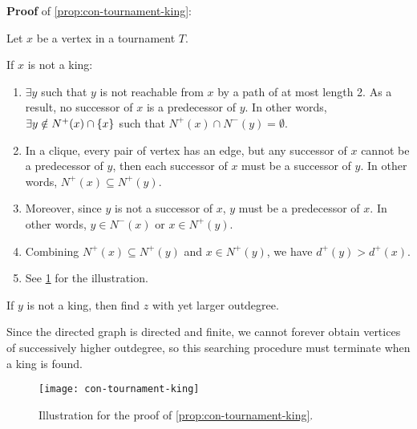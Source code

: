 \documentclass[../src/handouts/main.tex]{subfiles}
\begin{document}
\textbf{Proof} of \cref{prop:con-tournament-king}:
\begin{enumerate*}
  \item Let $x$ be a vertex in a tournament $T$. 
  \item If $x$ is not a king:
    \begin{enumerate}
      \item $\exists y$ such that $y$ is not reachable from $x$ by a path of at most length 2. As a result, no successor of $x$ is a predecessor of $y$. In other words, $\exists y \notin N^{+}(x) \cap \lbrace x\rbrace$ such that $N^{+}(x) \cap N^{-}(y) = \emptyset$.

      \item In a clique, every pair of vertex has an edge, but any successor of $x$ cannot be a predecessor of $y$, then each successor of $x$ must be a successor of $y$. In other words, $N^{+}(x) \subseteq N^{+}(y)$.

      \item Moreover, since $y$ is not a successor of $x$, $y$ must be a predecessor of $x$. In other words, $y \in N^{-}(x)$ or $x \in N^{+}(y)$.

      \item Combining $N^{+}(x) \subseteq N^{+}(y)$ and $x \in N^{+}(y)$, we have $d^{+}(y) > d^{+}(x)$.

      \item See \cref{fig:con-tournament-king} for the illustration.
    \end{enumerate}

  \item If $y$ is not a king, then find $z$ with yet larger outdegree.
  \item Since the directed graph is directed and finite, we cannot forever obtain vertices of successively higher outdegree, so this searching procedure must terminate when a king is found.
\end{enumerate*}

\begin{figure}[htbp]
  \centering
  \texttt{[image: con-tournament-king]}
  \caption{Illustration for the proof of \cref{prop:con-tournament-king}.}
  \label{fig:con-tournament-king}
\end{figure}
\end{document}
